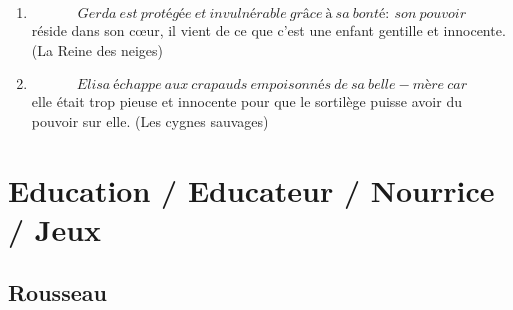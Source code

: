 \documentclass[a4paper, 11pt, hidelinks]{article}
\begin{document}
\begin{enumerate}
    \item \[ Gerda \ est \ protégée \ et \ invulnérable \ grâce \ à \ sa \ bonté: \ son \ pouvoir \] réside dans son c\oe ur, il vient de ce que c'est une enfant gentille et innocente. (La Reine des neiges)
    \item \[ Elisa \ échappe \ aux \ crapauds \ empoisonnés \ de \ sa \ belle-mère \ car \] elle était trop pieuse et innocente pour que le sortilège puisse avoir du pouvoir sur elle. (Les cygnes sauvages)
\end{enumerate}


















































\section{Education / Educateur / Nourrice / Jeux}



\subsection{Rousseau}
\end{document}
